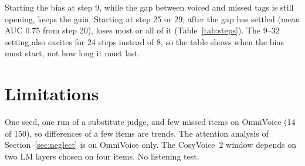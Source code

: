 \documentclass[11pt]{article}
\begin{document}
Starting the bias at step 9, while the gap between voiced and missed tags is still opening, keeps the gain. Starting at step 25 or 29, after the gap has settled (mean AUC 0.75 from step 20), loses most or all of it (Table~\ref{tab:steps}). The 9--32 setting also excites for 24 steps instead of 8, so the table shows when the bias must start, not how long it must last.

\section*{Limitations}
One seed, one run of a substitute judge, and few missed items on OmniVoice (14 of 150), so differences of a few items are trends. The attention analysis of Section~\ref{sec:neglect} is on OmniVoice only. The CosyVoice~2 window depends on two LM layers chosen on four items. No listening test.


\end{document}
